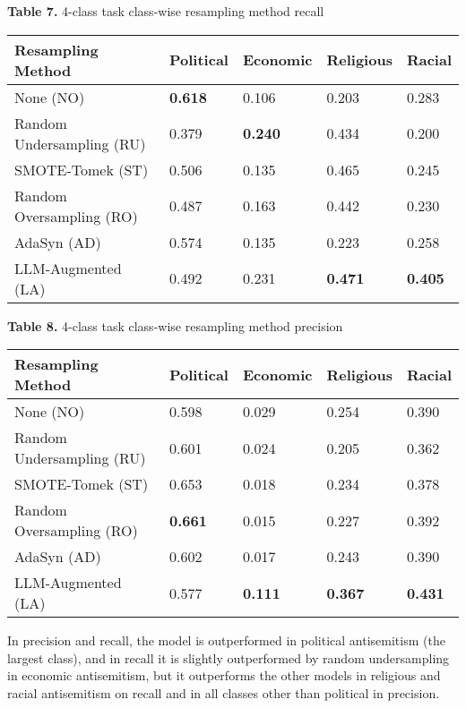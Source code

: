 \documentclass[runningheads]{llncs}
\newenvironment{nscenter}
 {\parskip=0pt\par\nopagebreak\centering}
 {\par\noindent\ignorespacesafterend}
\begin{document}
\begin{nscenter}
{\bf Table 7.} 4-class task class-wise resampling method recall\\

\begin{tabular}{|l|l|l|l|l|}
\hline
Resampling Method & Political & Economic & Religious & Racial \\\hline
None (NO) & {\bf 0.618} & 0.106 & 0.203 & 0.283 \\\hline
Random Undersampling (RU) & 0.379 & {\bf 0.240} & 0.434 & 0.200  \\\hline
SMOTE-Tomek (ST) & 0.506 & 0.135 & 0.465 & 0.245 \\\hline
Random Oversampling (RO) & 0.487 & 0.163 & 0.442 & 0.230 \\\hline
AdaSyn (AD) & 0.574 & 0.135 & 0.223 & 0.258 \\\hline
LLM-Augmented (LA) & 0.492 & 0.231 & {\bf 0.471} & {\bf 0.405} \\\hline
\end{tabular}

{\bf Table 8.} 4-class task class-wise resampling method precision\\

\begin{tabular}{|l|l|l|l|l|}
\hline
Resampling Method & Political & Economic & Religious & Racial \\\hline
None (NO) & 0.598 & 0.029 & 0.254 & 0.390 \\\hline
Random Undersampling (RU) & 0.601 & 0.024 & 0.205 & 0.362 \\\hline
SMOTE-Tomek (ST) & 0.653 & 0.018 & 0.234 & 0.378 \\\hline
Random Oversampling (RO) & {\bf 0.661} & 0.015 & 0.227 & 0.392 \\\hline
AdaSyn (AD) & 0.602 & 0.017 & 0.243 & 0.390 \\\hline
LLM-Augmented (LA) & 0.577 &{\bf  0.111} & {\bf 0.367} & {\bf 0.431} \\\hline
\end{tabular}
\end{nscenter}
In precision and recall, the model is outperformed in political antisemitism (the largest class), and in recall it is slightly outperformed by random undersampling in economic antisemitism, but it outperforms the other models in religious and racial antisemitism on recall and in all classes other than political in precision.
\end{document}
